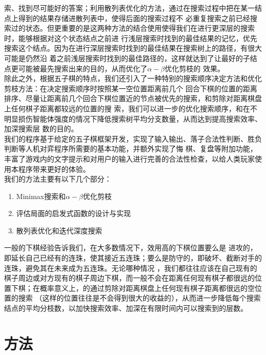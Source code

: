 \documentclass{acm_proc_article-sp}
\begin{document}
索、找到尽可能好的答案；利用散列表优化的方法，通过在搜索过程中把在某一结点上得到的结果存储进散列表中，使得后面的搜索过程不
必重复搜索之前已经搜索过的状态。但更重要的是这两种方法的结合使用使得我们在进行更深层的搜索时，能够根据对这个状态结点之前进
行浅层搜索时找到的最佳结果的记忆，优先搜索这个结点。因为在进行深层搜索时找到的最佳结果在搜索树上的路径，有很大可能是仍然沿
着之前浅层搜索时找到的最佳路径的，这样就达到了让最好的子结点更可能被最先搜索出来的目的，从而优化了$\alpha-\beta$优化剪枝的
效果。\\
除此之外，根据五子棋的特点，我们还引入了一种特别的搜索顺序决定方法和优化剪枝方法：在决定搜索顺序时按照某一空位置距离前几个
回合下棋的位置的距离排序、尽量让距离前几个回合下棋位置近的节点被优先的搜索，和剪除对距离棋盘上任何棋子距离都较远的位置的搜
索，我们可以进一步的优化搜索顺序，和在不明显损伤智能体强度的情况下降低搜索树平均分支数量，从而达到提高搜索效率、加深搜索层
数的目的。\\
我们的程序基于给定的五子棋框架开发，实现了输入输出、落子合法性判断、胜负判断等人机对弈程序所需要的基本功能，并额外实现了悔
棋、复盘等附加功能，丰富了游戏内的文字提示和对用户的输入进行完善的合法性检查，以给人类玩家使用本程序带来更好的体验。\\

我们的方法主要有以下几个部分：
\begin{enumerate}
       \item Minimax搜索和$\alpha-\beta$优化剪枝
       \item 评估局面的启发式函数的设计与实现
       \item 散列表优化和迭代深度搜索
\end{enumerate}

一般的下棋经验告诉我们，在大多数情况下，效用高的下棋位置要么是
进攻的，即延长自己已经有的连珠，使其接近五连珠；要么是防守的，即破坏、截断对手的连珠，避免其在未来成为五连珠。无论哪种情况
，我们都往往应该在自己现有的棋子周边或对方现有的棋子周边下棋，而一般不会在距离任何现有棋子都很远的位置下棋；在概率意义上，的通过剪除对距离棋盘上任何现有棋子距离都很远的空位置的搜索
（这样的位置往往是不会得到很大的收益的），从而进一步降低每个搜索结点的平均分枝数，以加快搜索效率、加深在有限时间内可以搜索到的层数。\\

\section{\textbf{方法}}
\end{document}

